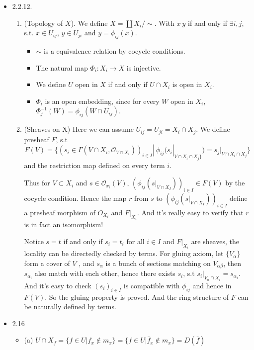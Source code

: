 \documentclass[11pt]{article}
\begin{document}
\begin{itemize}
\item 2.2.12.\
  \begin{enumerate}
  \item (Topology of $X$). We define $X=\coprod X_i/\sim$. With $x~y$ if and only if $\exists{} i,j$, s.t. $x\in U_{ij}$, $y\in U_{ji}$ and $y=\phi_{ij}(x)$.
    \begin{itemize}
    \item $\sim$ is a equivalence relation by cocycle conditions.
    \item The natural map $\Phi_i: X_i\to X$ is injective.
    \item We define $U$ open in $X$ if and only if $U\cap X_i$ is open in $X_i$.
    \item $\Phi_i$ is an open embedding, since for every $W$ open in $X_i$, $\Phi_j^{-1}(W)=\phi_{ij}(W \cap U_{ij})$.
    \end{itemize}
  \item (Sheaves on X) Here we can assume $U_{ij}=U_{ji}=X_i\cap X_j$. We define presheaf $F$, s.t 
$$F(V)=\{(s_i \in \Gamma(V \cap X_i,\mathcal{O}_{V \cap X_i}))_{i\in I}|\  \phi_{ij}(s_i|_{V\cap X_i \cap X_j\}})=s_j|_{V\cap X_i \cap X_j}\}$$ and the restriction map defined on every term $i$.

Thus for $V \subset X_i$ and $s \in \mathcal{O}_{x_i}(V)$, $(\phi_{ij}(s|_{V \cap X_I}))_{i \in I} \in F(V)$ by the cocycle condition. Hence the map $r$ from $s$ to $(\phi_{ij}(s|_{V \cap X_I}))_{i \in I}$ define a presheaf morphism of $O_{X_i}$ and $F|_{X_i}$. And it's really easy to verify that $r$ is in fact an isomorphism!

Notice $s=t$ if and only if $s_i=t_i$ for all $i\in I$ and $F|_{X_i}$ are sheaves, the locality can be directedly checked by terms. For gluing axiom, let $\{V_\alpha\}$ form a cover of $V$ , and $s_\alpha$ is a bunch of sections matching on $V_{\alpha\beta}$, then $s_{\alpha_i}$ also match with each other, hence there exists $s_i$, s.t $s_i|_{V_\alpha \cap X_i}=s_{\alpha_i}$. And it's easy to check $(s_i)_{i\in I}$ is compatible with $\phi_{ij}$ and hence in $F(V)$. So the gluing property is proved. And the ring structure of $F$ can be naturally defined by terms.
  \end{enumerate} 
   
\item 2.16
  \begin{itemize}
  \item (a) $U\cap X_f=\{f\in U|f_x \notin m_x\} =\{f\in U| \bar{f}_x\notin m_x\}=D(\bar{f})$


\end{itemize}
\end{itemize}
\end{document}
